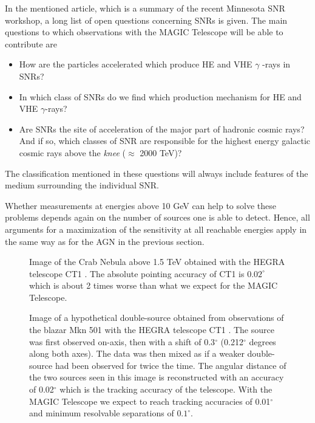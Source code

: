 In the mentioned article, which is a summary of the recent Minnesota SNR
workshop, a long list of open questions concerning SNRs is given. The main
questions to which observations with the MAGIC Telescope will be able to
contribute are

\begin{itemize}
\item  How are the particles accelerated which produce HE and VHE $\gamma $%
-rays in SNRs?

\item  In which class of SNRs do we find which production mechanism for HE
and VHE $\gamma $-rays?

\item  Are SNRs the site of acceleration of the major part of hadronic
cosmic rays? And if so, which classes of SNR are responsible for the highest
energy galactic cosmic rays above the {\it knee} ($\approx $ 2000 TeV)?
\end{itemize}

The classification mentioned in these questions will always include features
of the medium surrounding the individual SNR.

Whether measurements at energies above 10 GeV can help to solve these
problems depends again on the number of sources one is able to detect.
Hence, all arguments for a maximization of the sensitivity at all reachable
energies apply in the same way as for the AGN in the previous section.

\begin{figure} \centering \leavevmode
\epsfxsize=12cm
\caption{\label{fig-crabct1}
Image of the Crab Nebula above 1.5 TeV obtained with the HEGRA \Cherenkov
telescope CT1
\protect\cite{petry:97}.
The absolute pointing accuracy of CT1 is $0.02^\circ$ which is about 2 times
worse than
what we expect for the MAGIC Telescope.}
\end{figure}

\begin{figure} \centering \leavevmode
\epsfxsize=10cm
\caption{\label{fig-501double}
Image of a hypothetical double-source obtained from observations of the
blazar
Mkn 501 with the HEGRA \Cherenkov telescope CT1 \protect\cite{petry:97}.
The source was first observed on-axis,
then with a shift of 0.3$^\circ$ (0.212$^\circ$ degrees along both axes).
The data was then
mixed as if a weaker double-source had been observed for twice the time. The
angular
distance of the two sources seen in this image is reconstructed with an
accuracy of
0.02$^\circ$ which is the tracking accuracy of the telescope. With the MAGIC
Telescope we
expect to reach tracking accuracies of 0.01$^\circ$ and minimum resolvable
separations of
$0.1^\circ$.
}
\end{figure}

